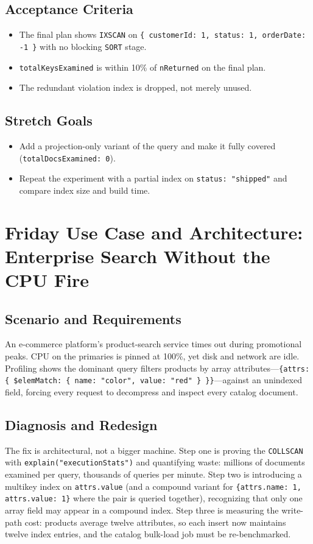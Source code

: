 \subsection*{Acceptance Criteria}
\begin{itemize}
    \item The final plan shows \texttt{IXSCAN} on \texttt{\{ customerId: 1, status: 1, orderDate: -1 \}} with no blocking \texttt{SORT} stage.
    \item \texttt{totalKeysExamined} is within 10\% of \texttt{nReturned} on the final plan.
    \item The redundant violation index is dropped, not merely unused.
\end{itemize}

\subsection*{Stretch Goals}
\begin{itemize}
    \item Add a projection-only variant of the query and make it fully covered (\texttt{totalDocsExamined: 0}).
    \item Repeat the experiment with a partial index on \texttt{status: "shipped"} and compare index size and build time.
\end{itemize}

\section{Friday Use Case and Architecture: Enterprise Search Without the CPU Fire}
\subsection{Scenario and Requirements}
An e-commerce platform's product-search service times out during promotional peaks. CPU on the primaries is pinned at 100\%, yet disk and network are idle. Profiling shows the dominant query filters products by array attributes---\texttt{\{attrs: \{ \$elemMatch: \{ name: "color", value: "red" \} \}\}}---against an unindexed field, forcing every request to decompress and inspect every catalog document.

\subsection{Diagnosis and Redesign}
The fix is architectural, not a bigger machine. Step one is proving the \texttt{COLLSCAN} with \texttt{explain("executionStats")} and quantifying waste: millions of documents examined per query, thousands of queries per minute. Step two is introducing a multikey index on \texttt{attrs.value} (and a compound variant for \texttt{\{attrs.name: 1, attrs.value: 1\}} where the pair is queried together), recognizing that only one array field may appear in a compound index. Step three is measuring the write-path cost: products average twelve attributes, so each insert now maintains twelve index entries, and the catalog bulk-load job must be re-benchmarked.

